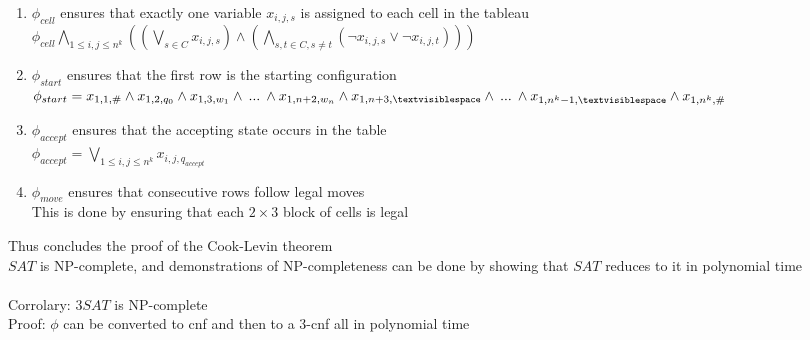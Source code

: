 \documentclass{article}
\newcommand{\tmblank}{\textvisiblespace}
\newcommand*{\<}{\langle}
\renewcommand*{\>}{\rangle}
\begin{document}
			\begin{enumerate}
				\item $\phi_{cell}$ ensures that exactly one variable $x_{i, j, s}$ is assigned to each cell in the tableau \\
				$\phi_{cell} \bigwedge_{1 \leq i, j \leq n^k}((\bigvee_{s \in C} x_{i, j, s}) \land (\bigwedge_{s, t \in C, s \neq t}(\neg x_{i, j, s} \lor \neg x_{i, j, t})))$
				\item $\phi_{start}$ ensures that the first row is the starting configuration \\
				$\phi_{start} = x_{1, 1, \#} \land x_{1, 2, q_0} \land x_{1, 3, w_1} \land\:...\:\land  x_{1, n + 2, w_n} \land x_{1, n + 3, \tmblank} \land\:...\:\land x_{1, n^k - 1, \tmblank} \land x_{1, n^k, \#}$
				\item $\phi_{accept}$ ensures that the accepting state occurs in the table \\
				$\phi_{accept} = \bigvee_{1 \leq i, j \leq n^k} x_{i, j, q_{accept}}$
				\item $\phi_{move}$ ensures that consecutive rows follow legal moves \\
				This is done by ensuring that each $2 \times 3$ block of cells is legal
				\end{enumerate}
			Thus concludes the proof of the Cook-Levin theorem \\
			$SAT$ is NP-complete, and demonstrations of NP-completeness can be done by showing that $SAT$ reduces to it in polynomial time \\
			\\
			Corrolary: $3SAT$ is NP-complete \\
			Proof: $\phi$ can be converted to cnf and then to a 3-cnf all in polynomial time 
\end{document}
